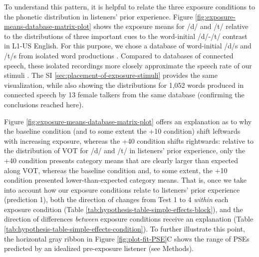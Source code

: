 \documentclass[
  11pt,
  man,mask,floatsintext]{apa6}
\begin{document}
To understand this pattern, it is helpful to relate the three exposure conditions to the phonetic distribution in listeners' prior experience. Figure \ref{fig:exposure-means-database-matrix-plot} shows the exposure means for /d/ and /t/ relative to the distributions of three important cues to the word-initial /d/-/t/ contrast in L1-US English. For this purpose, we chose a database of word-initial /d/s and /t/s from isolated word productions \autocite{chodroff-wilson2018}. Compared to databases of connected speech, these isolated recordings more closely approximate the speech rate of our stimuli \autocites[which is known to affect the perception of VOT,][]{allen-miller1999,utman1998}. The SI \ref{sec:placement-of-exposure-stimuli} provides the same visualization, while also showing the distributions for 1,052 words produced in connected speech by 13 female talkers from the same database (confirming the conclusions reached here).

Figure \ref{fig:exposure-means-database-matrix-plot} offers an explanation as to why the baseline condition (and to some extent the +10 condition) shift leftwards with increasing exposure, whereas the +40 condition shifts rightwards: relative to the distribution of VOT for /d/ and /t/ in listeners' prior experience, only the +40 condition presents category means that are clearly larger than expected along VOT, whereas the baseline condition and, to some extent, the +10 condition presented lower-than-expected category means. That is, once we take into account how our exposure conditions relate to listeners' prior experience (prediction 1), both the direction of changes from Test 1 to 4 \emph{within} each exposure condition (Table \ref{tab:hypothesis-table-simple-effects-block}), and the direction of differences \emph{between} exposure conditions receive an explanation (Table \ref{tab:hypothesis-table-simple-effects-condition}). To further illustrate this point, the horizontal gray ribbon in Figure \ref{fig:plot-fit-PSE}C shows the range of PSEs predicted by an idealized pre-exposure listener (see Methods).
\end{document}
